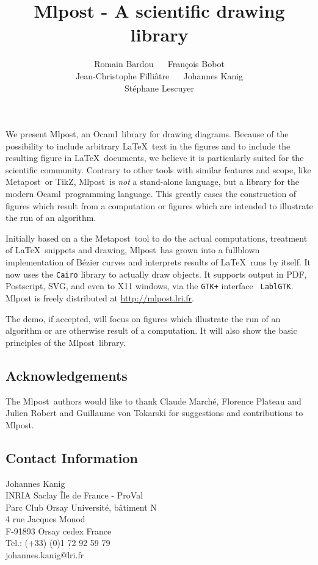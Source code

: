 \documentclass{article}
\title{Mlpost - A scientific drawing library}
\date{}
\author{Romain Bardou ~\hfill~ François Bobot \\ Jean-Christophe
  Filliâtre ~\hfill~ Johannes Kanig \\ Stéphane Lescuyer}
\newcommand{\mlpost}{Mlpost}
\newcommand{\ocaml}{Ocaml}
\newcommand{\metapost}{Metapost}
\newcommand{\tikz}{TikZ}
\begin{document}
\maketitle

We present \mlpost, an \ocaml\ library for drawing diagrams. Because
of the possibility to include arbitrary \LaTeX\ text in the figures
and to include the resulting figure in \LaTeX\ documents, we believe
it is particularly suited for the scientific community. Contrary to
other tools with similar features and scope, like \metapost\ or \tikz,
\mlpost\ is {\em not} a stand-alone language, but a library for the
modern \ocaml\ programming language. This greatly eases the
construction of figures which result from a computation or figures
which are intended to illustrate the run of an algorithm.

Initially based on a the \metapost\ tool to do the actual
computations, treatment of \LaTeX\ snippets and drawing, \mlpost\ has
grown into a fullblown implementation of Bézier curves and interprets
results of \LaTeX\ runs by itself. It now uses the {\tt Cairo} library
to actually draw objects. It supports output in PDF, Postscript, SVG,
and even to X11 windows, via the {\tt GTK+} interface {\tt
  LablGTK}. Mlpost is freely distributed at \url{http://mlpost.lri.fr}.

The demo, if accepted, will focus on figures which illustrate the run
of an algorithm or are otherwise result of a computation. It will also
show the basic principles of the \mlpost\ library.


\subsection*{Acknowledgements} 

The \mlpost\ authors would like to thank Claude Marché, Florence
Plateau and Julien Robert and Guillaume von Tokarski for suggestions
and contributions to \mlpost.

\subsection*{Contact Information}

Johannes Kanig\\
INRIA Saclay Île de France - ProVal\\
Parc Club Orsay Université, bâtiment N\\
4 rue Jacques Monod\\
F-91893 Orsay cedex France\\
Tel.: (+33) (0)1 72 92 59 79\\
johannes.kanig@lri.fr
\end{document}
